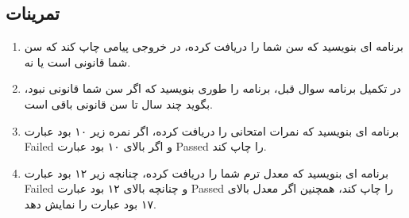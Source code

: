 \documentclass[11pt]{article}
\begin{document}
\subsection{تمرینات}
\begin{enumerate}
\item برنامه ای بنویسید که سن شما را دریافت کرده، در خروجی پیامی چاپ کند که سن شما قانونی است یا نه. 
\item در تکمیل برنامه سوال قبل، برنامه را طوری بنویسید که اگر سن شما قانونی نبود، بگوید چند سال تا سن قانونی باقی است.
\item برنامه ای بنویسید که نمرات امتحانی را دریافت کرده، اگر نمره زیر ۱۰ بود عبارت Failed و اگر بالای ۱۰ بود عبارت Passed را چاپ کند.
\item برنامه ای بنویسید که معدل ترم شما را دریافت کرده، چنانچه زیر ۱۲ بود عبارت Failed و چنانچه بالای ۱۲ بود عبارت Passed را چاپ کند، همچنین اگر معدل بالای ۱۷ بود عبارت 
را نمایش دهد.
\end{enumerate}
\newpage{}
\end{document}
